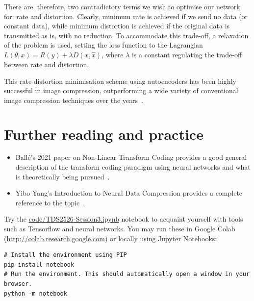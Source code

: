 There are, therefore, two contradictory terms we wish to optimise our network for: rate and distortion. Clearly, minimum rate is achieved if we send no data (or constant data), while minimum distortion is achieved if the original data is transmitted as is, with no reduction. To accommodate this trade-off, a relaxation of the problem is used, setting the loss function to the Lagrangian $L(\theta, x) = R(y) + \lambda D(x, \hat{x})$, where $\lambda$ is a constant regulating the trade-off between rate and distortion.

This rate-distortion minimisation scheme using autoencoders has been highly successful in image compression, outperforming a wide variety of conventional image compression techniques over the years~\cite{BalleLaparra2017factorised, balle2018hyperprior, minnen2018hierarchical, choi2019conditional, cheng2019residual, yang2020modulated, cheng2020gmm_attention, yang2021slimmable,  He2022ELIC, fu2024checkerboardresidual}.


\section*{Further reading and practice}
\vspace{0.25cm}

\begin{itemize}
\item Ballé's 2021 paper on Non-Linear Transform Coding provides a good general description of the transform coding paradigm using neural networks and what is theoretically being pursued~\cite{Balle2021NTC}.
\vspace{0.1cm}
\item Yibo Yang's Introduction to Neural Data Compression provides a complete reference to the topic~\cite{Yang2023Introduction}.
\end{itemize}

\begin{exercise}
Try the \url{code/TDS2526-Session3.ipynb} notebook to acquaint yourself with tools such as Tensorflow and neural networks. You may run these in Google Colab (\url{http://colab.research.google.com}) or locally using Jupyter Notebooks:

\begin{verbatim}
# Install the environment using PIP
pip install notebook
# Run the environment. This should automatically open a window in your browser.
python -m notebook
\end{verbatim}
\end{exercise}
